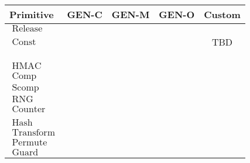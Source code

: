 \documentclass[a4paper,twocolumn]{article}
\newcommand{\cm}{\checkmark}
\DeclareMathOperator{\hash}{Hash}
\DeclareMathOperator{\hmac}{HMAC}
\DeclareMathOperator{\encctr}{Enc_{ctr}}
\DeclareMathOperator{\decctr}{Dec_{ctr}}
\DeclareMathOperator{\rng}{RNG}
\DeclareMathOperator{\dhsec}{DH_{Sec}}
\DeclareMathOperator{\dhpub}{DH_{Pub}}
\DeclareMathOperator{\guard}{Guard}
\DeclareMathOperator{\release}{Release}
\DeclareMathOperator{\const}{Const}
\DeclareMathOperator{\permute}{Permute}
\DeclareMathOperator{\transform}{Transform}
\DeclareMathOperator{\comp}{Comp}
\DeclareMathOperator{\streamcomp}{Scomp}
\DeclareMathOperator{\counter}{Counter}
\newcommand{\geno}{GEN\mbox{-}O{}}
\newcommand{\genm}{GEN\mbox{-}M{}}
\newcommand{\genc}{GEN\mbox{-}C{}}
\begin{document}
\begin{tabular}{l|c|c|c|c} \hline
Primitive   & \genc{} & \genm{} & \geno{} & Custom \\\hline
$\release$    &         &         &         &        \\ 
$\const$      &         &         &         & TBD    \\
$\dhsec$      &         & \cm     &         & \cm    \\
$\encctr$     &         & \cm     &         & \cm    \\
$\decctr$     &         & \cm     &         & \cm    \\
$\hmac$       &         & \cm     &         & \cm    \\
$\comp$       &         & \cm     & \cm     &        \\
$\streamcomp$ &         & \cm     & \cm     &        \\
$\rng$        &         & \cm     & \cm     &        \\
$\counter$    &         & \cm     & \cm     & \cm    \\
$\dhpub$      &         & \cm     & \cm     & \cm    \\
$\hash$       & \cm     & \cm     &         &        \\
$\transform$  & \cm     & \cm     &         &        \\
$\permute$    & \cm     & \cm     & \cm     &        \\
$\guard$      & \cm     & \cm     & \cm     & \cm    \\
\end{tabular}



\end{document}
